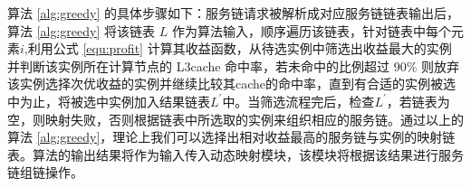 算法 \ref{alg:greedy} 的具体步骤如下：服务链请求被解析成对应服务链链表输出后，算法 \ref{alg:greedy} 将该链表 $L$ 作为算法输入，顺序遍历该链表，针对链表中每个元素$i$,利用公式 \ref{equ:profit} 计算其收益函数，从待选实例中筛选出收益最大的实例并判断该实例所在计算节点的 L3cache 命中率，若未命中的比例超过 90\% 则放弃该实例选择次优收益的实例并继续比较其cache的命中率，直到有合适的实例被选中为止，将被选中实例加入结果链表$L^{\prime}$中。当筛选流程完后，检查$L^{\prime}$，若链表为空，则映射失败，否则根据链表中所选取的实例来组织相应的服务链。通过以上的算法 \ref{alg:greedy}，理论上我们可以选择出相对收益最高的服务链与实例的映射链表。算法的输出结果将作为输入传入动态映射模块，该模块将根据该结果进行服务链组链操作。

